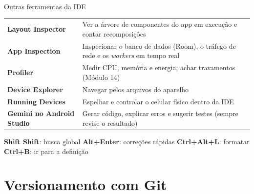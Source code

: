 \documentclass[aspectratio=169,10pt]{beamer}
\begin{document}
\begin{frame}{Outras ferramentas da IDE}
  \small
  \begin{tabularx}{\textwidth}{@{}l L@{}}
    \toprule
     &  \\
    \midrule
    \textbf{Layout Inspector} & Ver a árvore de componentes do app em execução e contar recomposições \\
    \textbf{App Inspection} & Inspecionar o banco de dados (Room), o tráfego de rede e os \emph{workers} em tempo real \\
    \textbf{Profiler} & Medir CPU, memória e energia; achar travamentos (Módulo 14) \\
    \textbf{Device Explorer} & Navegar pelos arquivos do aparelho \\
    \textbf{Running Devices} & Espelhar e controlar o celular físico dentro da IDE \\
    \textbf{Gemini no Android Studio} & Gerar código, explicar erros e sugerir testes (sempre revise o resultado) \\
    \bottomrule
  \end{tabularx}
  \vspace{4pt}
  \begin{dica}
    \textbf{Shift Shift}: busca global \quad \textbf{Alt+Enter}: correções rápidas \quad \textbf{Ctrl+Alt+L}: formatar \quad \textbf{Ctrl+B}: ir para a definição
  \end{dica}
\end{frame}

\section{Versionamento com Git}
\end{document}
